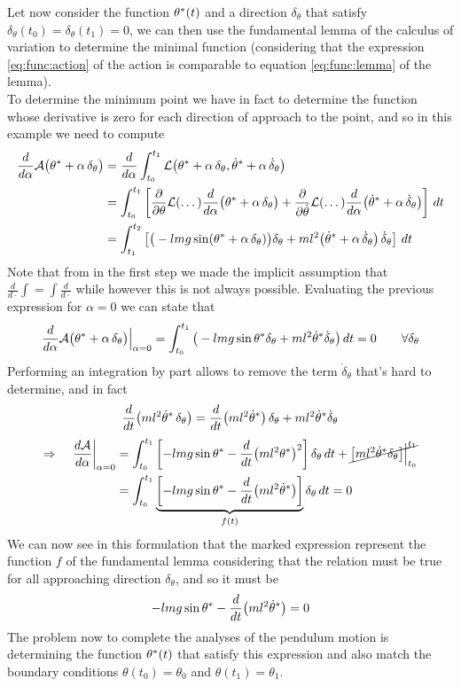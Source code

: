 	Let now consider the function $\theta^*(t)$ and a direction $\delta_\theta$ that satisfy $\delta_\theta(t_0)=\delta_\theta(t_1) = 0$, we can then use the fundamental lemma of the calculus of variation to determine the minimal function (considering that the expression \ref{eq:func:action} of the action is comparable to equation \ref{eq:func:lemma} of the lemma).\\
	To determine the minimum point we have in fact to determine the function whose derivative is zero for each direction of approach to the point, and so in this example we need to compute
	\begin{align*}
		\frac{d}{d\alpha} \mathcal A\big(\theta^* + \alpha\, \delta_\theta\big) & = \frac{d}{d\alpha}\int_{t_0}^{t_1} \mathcal L \big( \theta ^* + \alpha\, \delta_\theta, \dot\theta^* + \alpha\, \dot \delta_\theta \big) \\
		& = \int_{t_0}^{t_1} \left[\frac{\partial }{\partial \theta} \mathcal L( \dots ) \frac{d}{d\alpha}\big(\theta^* + \alpha \,\delta_\theta\big) +\frac{\partial }{\partial \dot\theta} \mathcal L (\dots) \frac{d}{d\alpha}\big(\dot \theta^* + \alpha \,\dot \delta_\theta\big) \right]\, dt \\
		& = \int_{t_1}^{t_2} \left[ \big(-lmg\sin(\theta^* + \alpha\, \delta_\theta)\big)\delta_\theta + ml^2\big(
		\dot\theta^* + \alpha \, \dot\delta_\theta \big)\, \dot\delta_\theta \right] \, dt
	\end{align*}
	Note that from in the first step we made the implicit assumption that $ \frac d{d\cdot} \int = \int\frac{d}{d\cdot}$ while however this is not always possible. Evaluating the previous expression for $\alpha = 0$ we can state that
	\[ 	\frac{d}{d\alpha} \mathcal A\big(\theta^* + \alpha\, \delta_\theta\big) \Big|_{\alpha = 0} = \int_{t_0}^{t_1} \big(-lmg \sin\theta^*\delta_\theta + ml^2\dot\theta^* \dot\delta_\theta \big) \, dt = 0 \qquad \forall \delta_\theta \]
	Performing an integration by part allows to remove the term $\dot\delta_\theta$ that's hard to determine, and in fact
	\[ \frac{d}{dt}\big( ml^2\dot\theta^* \, \delta_\theta\big) = \frac{d}{dt}\big(ml^2\dot\theta^*\big)\,\delta_\theta + ml^2\dot\theta^* \dot\delta_\theta\]
	\begin{align*}
		\Rightarrow \quad \left. \frac{d\mathcal A}{d\alpha}\right|_{\alpha = 0} & = \int_{t_0}^{t_1}  \left[ - lmg\sin\theta^* - \frac d{dt}\big(ml^2\theta^*\big)^2 \right]\delta_\theta\, dt + \cancel{\big[ ml^2 \dot\theta^* \delta_\theta \big]\Big|_{t_0}^{t_1} } \\
		& = \int_{t_0}^{t_1} \underbrace{\left[ -lmg \sin\theta^* - \frac d{dt}\big(ml^2 \dot\theta^*\big) \right]}_{f(t)} \delta_\theta\, dt = 0
	\end{align*}
	We can now see in this formulation that the marked expression represent the function $f$ of the fundamental lemma considering that the relation must be true for all approaching direction $\delta_\theta$, and so it must be
	\[ -lmg \sin\theta^* - \frac d{dt}\big(ml^2 \dot\theta^*\big) = 0 \]
	The problem now to complete the analyses of the pendulum motion is determining the function $\theta^*(t)$ that satisfy this expression and also match the boundary conditions $\theta(t_0) = \theta_0$ and $\theta(t_1)=\theta_1$.
	
